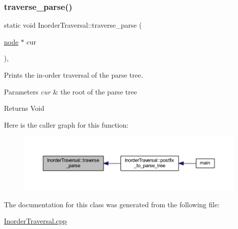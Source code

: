 \subsubsection{\texorpdfstring{traverse\+\_\+parse()}{traverse\_parse()}}
{\footnotesize\ttfamily static void Inorder\+Traversal\+::traverse\+\_\+parse (\begin{DoxyParamCaption}\item[{\mbox{\hyperlink{struct_inorder_traversal_1_1node}{node}} $\ast$}]{cur }\end{DoxyParamCaption})\hspace{0.3cm}{\ttfamily [inline]}, {\ttfamily [static]}}



Prints the in-\/order traversal of the parse tree. 


\begin{DoxyParams}{Parameters}
{\em cur} & the root of the parse tree \\
\hline
\end{DoxyParams}
\begin{DoxyReturn}{Returns}
Void 
\end{DoxyReturn}
Here is the caller graph for this function\+:\nopagebreak
\begin{figure}[H]
\begin{center}
\leavevmode
\includegraphics[width=350pt]{class_inorder_traversal_a9027f549ca60732409dbe4387785e0a4_icgraph}
\end{center}
\end{figure}


The documentation for this class was generated from the following file\+:\begin{DoxyCompactItemize}
\item 
\mbox{\hyperlink{_inorder_traversal_8cpp}{Inorder\+Traversal.\+cpp}}\end{DoxyCompactItemize}
